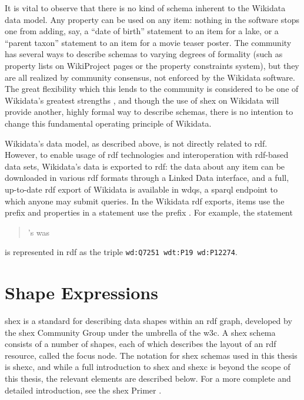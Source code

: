 It is vital to observe that there is no kind of \gls{schema} inherent to the \gls{Wikidata} data model.
Any \gls{property} can be used on any \gls{item}:
nothing in the software stops one from adding, say,
a “date of birth” \gls{statement} to an \gls{item} for a lake,
or a “parent taxon” \gls{statement} to an \gls{item} for a movie teaser poster.
The community has several ways to describe \glspl{schema} to varying degrees of formality
(such as \gls{property} lists on WikiProject pages or the property constraints system),
but they are all realized by community consensus,
not enforced by the \gls{Wikidata} software.
The great flexibility which this lends to the community
is considered to be one of \gls{Wikidata}’s greatest strengths \cite{vrandecic-restricting-the-world},
and though the use of \gls{shex}
on \gls{Wikidata} will provide another,
highly formal way to describe \glspl{schema},
there is no intention to change this fundamental operating principle of \gls{Wikidata}.

\Gls{Wikidata}’s data model, as described above,
is not directly related to \gls{rdf}.
However, to enable usage of \gls{rdf} technologies and interoperation with \gls{rdf}-based data sets,
\gls{Wikidata}’s data is exported to \gls{rdf}:
the data about any \gls{item} can be downloaded in various \gls{rdf} formats through a \gls{Linked Data} interface,
and a full, up-to-date \gls{rdf} export of \gls{Wikidata} is available in \gls{wdqs},
a \gls{sparql} endpoint to which anyone may submit queries.
In the \gls{Wikidata} \gls{rdf} exports,
items use the \gls{prefix}  and properties in a statement use the \gls{prefix} .
For example, the statement
\begin{quotation}
  ’s  was 
\end{quotation}
is represented in \gls{rdf} as the \gls{triple} \lstinline[language=sparql]{wd:Q7251 wdt:P19 wd:P12274}.

\section{Shape Expressions}
\label{sec:Background:ShEx}

\acrfull{shex} \cite{shex}
is a standard for describing data shapes within an \gls{rdf} graph,
developed by the \gls{shex} Community Group under the umbrella of the \gls{w3c}.
A \gls{shex} \gls{schema} consists of a number of \glspl{shape},
each of which describes the layout of an \gls{rdf} \gls{resource},
called the \gls{focus node}.
The notation for \gls{shex} \glspl{schema} used in this thesis is \gls{shexc},
and while a full introduction to \gls{shex} and \gls{shexc} is beyond the scope of this thesis,
the relevant elements are described below.
For a more complete and detailed introduction,
see the \gls{shex} Primer \cite{shex-primer}.


